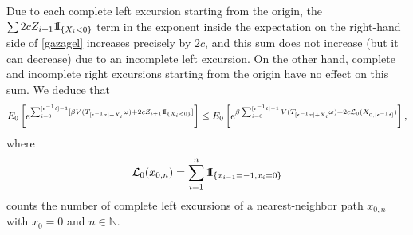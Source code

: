 \documentclass[a4paper]{amsart}
\numberwithin{equation}{section}
\theoremstyle{plain}
\theoremstyle{remark}
\begin{document}
Due to each complete left excursion starting from the origin, the $\sum 2cZ_{i+1}{{{\rm 1\mkern-1.5mu}\!{\rm I}}}_{\{X_i < 0\}}$ term in the exponent inside the expectation on the right-hand side of \eqref{gazagel} increases precisely by $2c$, and this sum does not increase (but it can decrease) due to an incomplete left excursion. On the other hand, complete and incomplete right excursions starting from the origin have no effect on this sum. We deduce that
\begin{equation}\label{protoUB}
E_0\left[e^{\sum_{i=0}^{[{\epsilon^{-1}} t]-1}[\beta V(T_{[{\epsilon^{-1}} x] + X_i}\omega) + 2cZ_{i+1}{{{\rm 1\mkern-1.5mu}\!{\rm I}}}_{\{X_i < 0\}}]}\right] \le E_0\left[e^{\beta\sum_{i=0}^{[{\epsilon^{-1}} t]-1}V(T_{[{\epsilon^{-1}} x] + X_i}\omega) + 2c\mathcal{L}_0(X_{0,[{\epsilon^{-1}} t]})}\right],
\end{equation}
where 
\begin{equation}\label{elemtere}
\mathcal{L}_0(x_{0,n}) = \sum_{i=1}^n{{{\rm 1\mkern-1.5mu}\!{\rm I}}}_{\{x_{i-1} = -1, x_i = 0\}}
\end{equation}
counts the number of complete left excursions of a nearest-neighbor path $x_{0,n}$ with $x_0 = 0$ and $n\in\mathbb{N}$.
\end{document}
